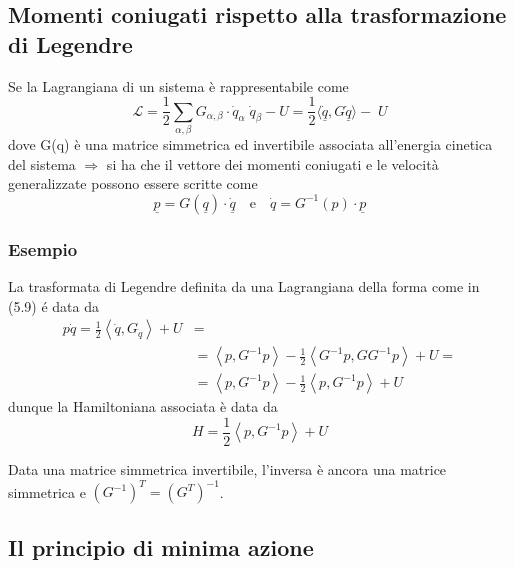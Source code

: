 \subsection{Momenti coniugati rispetto alla trasformazione di Legendre}

\begin{theorem}
Se la Lagrangiana di un sistema \`{e} rappresentabile come
\begin{equation}
	\mathcal{L} = \frac{1}{2} \sum_{\alpha, \beta}  G_{\alpha, \beta}  \cdot \dot{q}_\alpha \;\dot{q}_\beta-U = \frac{1}{2} \langle \underline{\dot q},G \underline{\dot q}\rangle - \;U
\end{equation}
dove G(q) \`{e} una matrice simmetrica ed invertibile associata all'energia cinetica del sistema $\Rightarrow$ si ha che il vettore dei momenti coniugati e le velocit\`{a} generalizzate possono essere scritte come
\begin{equation}
	\underline{p} = G(\underline{q})\cdot \underline{\dot q} \quad \text{e} \quad \dot q = G^{-1}(p) \cdot \underline p
\end{equation}
\end{theorem}

\subsubsection{Esempio}
La trasformata di Legendre definita da una Lagrangiana della forma come in (5.9) \'{e} data da
\begin{align*}
	 p \dot{q}=\frac{1}{2}\left\langle\dot{q}, G_{\dot{q}}\right\rangle+U &=\\
	&=\left\langle p, G^{-1} p\right\rangle-\frac{1}{2}\left\langle G^{-1} p, G G^{-1} p\right\rangle+U=\\
	&=\left\langle p, G^{-1} p\right\rangle-\frac{1}{2}\left\langle p, G^{-1} p\right\rangle+U
\end{align*}
dunque la Hamiltoniana associata \`{e} data da 
\begin{equation*}
	H = \dfrac{1}{2}\left\langle p, G^{-1} p\right\rangle + U
\end{equation*}

\begin{remark}
Data una matrice simmetrica invertibile, l'inversa \`{e} ancora una matrice simmetrica e $(G^{-1})^T = (G^T)^{-1}$.
\end{remark}

\subsection{Il principio di minima azione}

